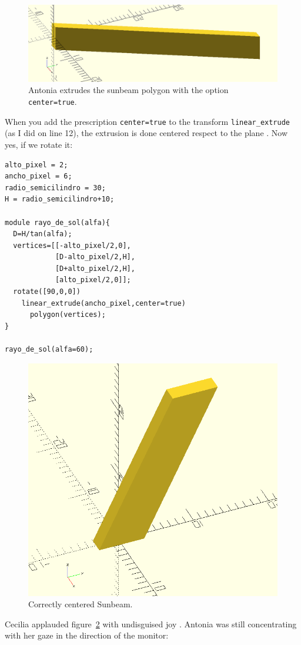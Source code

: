 \begin{figure}[ht]
  \centering
  \includegraphics[width=.8\textwidth]{imagenes/rayo-extrudido-3}  
  \caption{Antonia extrudes the sunbeam polygon with the option \lstinline!center=true!.}
  \label{fig:rayo-extrudido-3}
\end{figure}


\guillemotright{}When you add the prescription \lstinline!center=true! to the transform \lstinline!linear_extrude!  (as I did on line 12), the extrusion is done centered respect to the plane . Now yes, if we rotate it:

\begin{lstlisting}
alto_pixel = 2;
ancho_pixel = 6;
radio_semicilindro = 30;
H = radio_semicilindro+10;

module rayo_de_sol(alfa){
  D=H/tan(alfa);
  vertices=[[-alto_pixel/2,0],
            [D-alto_pixel/2,H],
            [D+alto_pixel/2,H],
            [alto_pixel/2,0]];
  rotate([90,0,0])
    linear_extrude(ancho_pixel,center=true)
      polygon(vertices);
}
 
rayo_de_sol(alfa=60);
\end{lstlisting}


\begin{figure}[ht]
  \centering
\includegraphics[width=.5\textwidth]{imagenes/rayo-extrudido-4.png}  
  \caption{Correctly centered Sunbeam.}
  \label{fig:rayo-extrudido-4}
\end{figure}

Cecilia applauded figure~\ref{fig:rayo-extrudido-4} with undisguised joy . Antonia was still concentrating with her gaze in the direction of the monitor:

